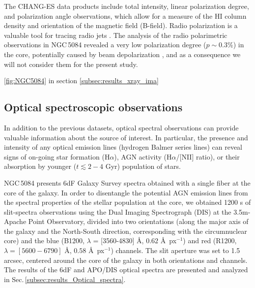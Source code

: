 \documentclass[modern]{CORE-AAS/aastex631}
\begin{document}
{The CHANG-ES data products include total intensity, linear polarization degree, and polarization angle observations, which allow for a measure of the HI column density and orientation of the magnetic field (B-field). Radio polarization is a valuable tool for tracing radio jets \citep{pasetto+2018aap613_74, sebastian+2020mnras499_334}. 
The analysis of the radio polarimetric observations in NGC\,5084 revealed a very low polarization degree ($p\sim0.3$\%) in the core, potentially caused by beam depolarization \citep{haverkorn+2004aap421_1011, pasetto+2018aap613_74}, and as a consequence we will not consider them for the present study. \par 

\cite{pan+2019apj881_119}
\ref{fig:NGC5084} in section \ref{subsec:results_xray_ima}
\subsection{Optical spectroscopic observations} \label{subsec:data_optical_spectra}

In addition to the previous datasets, optical spectral observations can provide valuable information about the source of interest. In particular, the presence and intensity of any optical emission lines (hydrogen Balmer series lines) can reveal signs of on-going star formation (H$\alpha$), AGN activity (H$\alpha$/[NII] ratio), or their absorption by younger ($t\lesssim 2-4$ Gyr) population of stars. 

NGC\,5084 presents 6dF Galaxy Survey spectra \citep{jones+2004mnras355_747,jones+2009mnras399_683} obtained with a single fiber at the core of the galaxy. In order to disentangle the potential AGN emission lines from the spectral properties of the stellar population at the core, we obtained 1200 s of slit-spectra observations using the Dual Imaging Spectrograph (DIS) at the 3.5m-Apache Point Observatory, divided into two orientations (along the major axis of the galaxy and the North-South direction, corresponding with the circumnuclear core) and the blue (B1200, $\lambda$ = [3560-4830] \AA, $0.62$ \AA\ px$^{-1}$) and red (R1200, $\lambda = [5600-6790]$ \AA, $0.58$ \AA\ px$^{-1}$) channels. The slit aperture was set to 1.5 arcsec, centered around the core of the galaxy in both orientations and channels. The results of the 6dF and APO/DIS optical spectra are presented and analyzed in Sec.\,\ref{subsec:results_Optical_spectra}.


}
\end{document}
